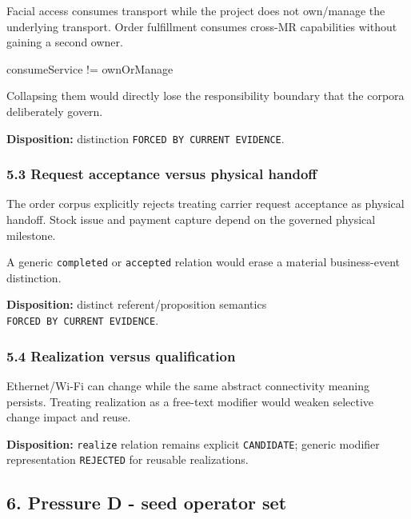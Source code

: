 \documentclass[
  10pt,
  letterpaper,
]{article}
\newenvironment{Shaded}{}{}
\newcommand{\NormalTok}[1]{#1}
\begin{document}
Facial access consumes transport while the project does not own/manage
the underlying transport. Order fulfillment consumes cross-MR
capabilities without gaining a second owner.

\begin{Shaded}
\begin{Highlighting}[]
\NormalTok{consumeService != ownOrManage}
\end{Highlighting}
\end{Shaded}

Collapsing them would directly lose the responsibility boundary that the
corpora deliberately govern.

\textbf{Disposition:} distinction
\texttt{FORCED\ BY\ CURRENT\ EVIDENCE}.

\subsubsection{5.3 Request acceptance versus physical
handoff}\label{request-acceptance-versus-physical-handoff}

The order corpus explicitly rejects treating carrier request acceptance
as physical handoff. Stock issue and payment capture depend on the
governed physical milestone.

A generic \texttt{completed} or \texttt{accepted} relation would erase a
material business-event distinction.

\textbf{Disposition:} distinct referent/proposition semantics
\texttt{FORCED\ BY\ CURRENT\ EVIDENCE}.

\subsubsection{5.4 Realization versus
qualification}\label{realization-versus-qualification}

Ethernet/Wi-Fi can change while the same abstract connectivity meaning
persists. Treating realization as a free-text modifier would weaken
selective change impact and reuse.

\textbf{Disposition:} \texttt{realize} relation remains explicit
\texttt{CANDIDATE}; generic modifier representation \texttt{REJECTED}
for reusable realizations.

\subsection{6. Pressure D - seed operator
set}\label{pressure-d---seed-operator-set}
\end{document}
